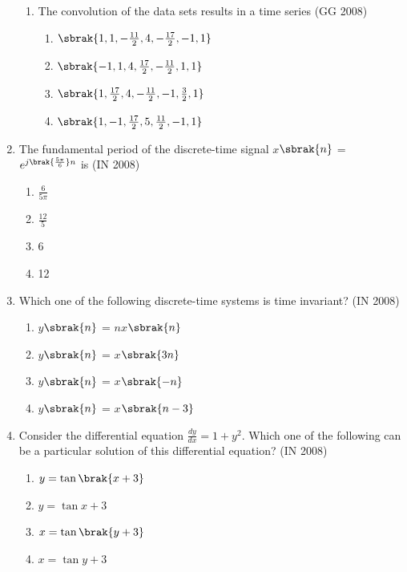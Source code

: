 \begin{enumerate}[label=\thesubsection.\arabic*,ref=\thesubsection.\theenumi]
\begin{enumerate}
    \item The convolution of the data sets results in a time series
    \hfill{(GG 2008)}
    \begin{multicols}{2}
	    \begin{enumerate}[itemsep=1ex]
            \item $\sbrak{1, 1, -\frac{11}{2}, 4, -\frac{17}{2}, -1, 1}$
            \item $\sbrak{-1, 1, 4, \frac{17}{2}, -\frac{11}{2}, 1, 1}$
            \item $\sbrak{1, \frac{17}{2}, 4, -\frac{11}{2}, -1, \frac{3}{2}, 1}$
            \item $\sbrak{1, -1, \frac{17}{2}, 5, \frac{11}{2}, -1, 1}$
        \end{enumerate}
    \end{multicols}
        \end{enumerate}
    \item  The fundamental period of the discrete-time signal
	    $x$$\sbrak{n}$ = $e^{j\brak{\frac{5\pi}{6}}n}$ is  \hfill{(IN 2008)}
    \begin{multicols}{4}
    \begin{enumerate} 
        \item $\frac{6}{5\pi}$
        \item $\frac{12}{5}$
        \item 6
        \item 12
    \end{enumerate}
    \end{multicols}
    
    \item  Which one of the following discrete-time systems is time invariant? \hfill{(IN 2008)}
    \begin{multicols}{4}
    \begin{enumerate} 
        \item $y$$\sbrak{n}$ = $nx$$\sbrak{n}$
        \item $y$$\sbrak{n}$ = $x$$\sbrak{3n}$
        \item $y$$\sbrak{n}$ = $x$$\sbrak{-n}$
        \item $y$$\sbrak{n}$ = $x$$\sbrak{n-3}$
    \end{enumerate}
    \end{multicols}
    \item Consider the differential equation $\frac{dy}{dx}=1 + y^2$. Which one of the following can be a particular solution of this differential equation? \hfill{(IN 2008)}
    \begin{multicols}{4}
    \begin{enumerate} 
        \item $y=\tan \brak{x+3}$
        \item $y=\tan x + 3$ 
        \item $x=\tan \brak{y+3}$ 
        \item $x=\tan y + 3$
    \end{enumerate}
    \end{multicols}


\end{enumerate}
